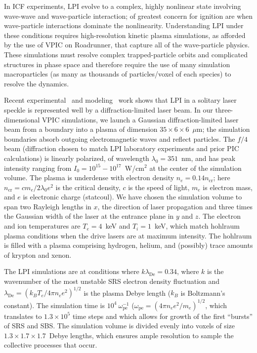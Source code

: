 \documentclass[10pt]{article}
\newcommand{\lde}      {\lambda_{\mathrm{De}}}
\newcommand{\wpe}      {\omega_{\mathrm{pe}}}
\begin{document}
In ICF experiments, LPI evolve to a complex, highly nonlinear state 
involving wave-wave and wave-particle interaction; of greatest concern for
ignition are when wave-particle interactions dominate the nonlinearity.
Understanding LPI under these conditions requires high-resolution
kinetic plasma simulations, as afforded by the use of VPIC on
Roadrunner, that capture all of the wave-particle physics.  These
simulations must resolve complex trapped-particle orbits and 
complicated structures in phase space and therefore require the use 
of many simulation macroparticles (as many as thousands of particles/voxel of
each species) to resolve the dynamics.~\cite{}

Recent experimental~\cite{} and modeling~\cite{} work shows that LPI
in a solitary laser speckle is represented well by a
diffraction-limited laser beam.  In our three-dimensional VPIC
simulations, we launch a Gaussian diffraction-limited laser beam from
a boundary into a plasma of dimension $35 \times 6 \times 6$~$\mu$m; 
the simulation boundaries absorb outgoing
electromagnetic waves and reflect particles.  The $f/4$ beam (diffraction
chosen to match LPI laboratory experiments and prior PIC calculations) is
linearly polarized, of wavelength $\lambda_0 = 351$~nm, and has peak
intensity ranging from $I_0 = 10^{15} - 10^{17}$~W/cm$^2$ at the center 
of the simulation volume.  The plasma is
underdense with electron density $n_e = 0.14 n_{\mathrm{cr}}$; here
$n_{\mathrm{cr}} = c m_e / 2 \lambda_0 e^2$ is the critical
density, $c$ is the speed of light, $m_e$ is electron mass, and $e$ is 
electronic charge (statcoul).
We have chosen the simulation volume to span two Rayleigh lengths in
$x$, the direction of laser propagation and three times the Gaussian
width of the laser at the entrance plane in $y$ and $z$.  The electron 
and ion temperatures are $T_e = 4$~keV and $T_i = 1$~keV, which
match hohlraum plasma conditions when the drive lasers are at maximum
intensity.  The hohlraum is filled with a plasma comprising hydrogen,
helium, and (possibly) trace amounts of krypton and xenon.

The LPI simulations are at conditions where $k \lde = 0.34$,
where $k$ is the wavenumber of the most unstable SRS electron density
fluctuation and $\lde = (k_B T_e / 4 \pi n_e e^2)^{1/2}$ is the plasma 
Debye length ($k_B$ is Boltzmann's constant).  The simulation
time is $10^4~\wpe^{-1}$ ($\wpe = (4 \pi n_e e^2 / m_e)^{1/2}$, which
translates to $1.3 \times 10^5$ time steps and which allows for
growth of the first ``bursts'' of SRS and SBS.  The simulation 
volume is divided evenly
into voxels of size $1.3 \times 1.7 \times 1.7$~Debye lengths,
which ensures ample resolution to sample the collective processes that 
occur. 
\end{document}
